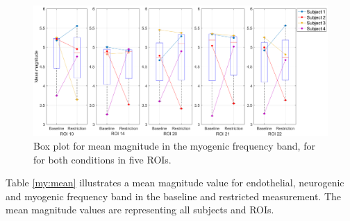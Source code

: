 \begin{figure}[H]
	\includegraphics[width=1\textwidth]{figures/boxplot_myo}
	\caption{Box plot for mean magnitude in the myogenic frequency band, for for both conditions in five ROIs.}
	\label{fig:boxMyo}
\end{figure}
 
 Table \ref{my:mean} illustrates a mean magnitude value for endothelial, neurogenic and myogenic frequency band in the baseline and restricted measurement. The mean magnitude values are representing all subjects and ROIs. 
 \begin{table} [thpb]
 	\caption{Table showing the mean magnitudes of each frequency band in both measured conditions.}
 	\label{my:mean}
 	\centering
 	
 \end{table}

